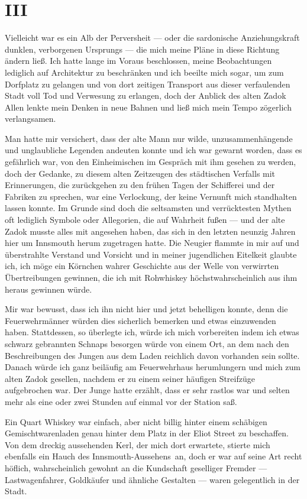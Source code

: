 \chapter*{III}

Vielleicht war es ein Alb der Perversheit --- oder die sardonische Anziehungskraft dunklen, verborgenen Ursprungs --- die mich meine Pläne in diese Richtung ändern ließ. Ich hatte lange im Voraus beschlossen, meine Beobachtungen lediglich auf Architektur zu beschränken und ich beeilte mich sogar, um zum Dorfplatz zu gelangen und von dort zeitigen Transport aus dieser verfaulenden Stadt voll Tod und Verwesung zu erlangen, doch der Anblick des alten Zadok Allen lenkte mein Denken in neue Bahnen und ließ mich mein Tempo zögerlich verlangsamen.

Man hatte mir versichert, dass der alte Mann nur wilde, unzusammenhängende und unglaubliche Legenden andeuten konnte und ich war gewarnt worden, dass es gefährlich war, von den Einheimischen im Gespräch mit ihm gesehen zu werden, doch der Gedanke, zu diesem alten Zeitzeugen des städtischen Verfalls mit Erinnerungen, die zurückgehen zu den frühen Tagen der Schifferei und der Fabriken zu sprechen, war eine Verlockung, der keine Vernunft mich standhalten lassen konnte. Im Grunde sind doch die seltsamsten und verrücktesten Mythen oft lediglich Symbole oder Allegorien, die auf Wahrheit fußen --- und der alte Zadok musste alles mit angesehen haben, das sich in den letzten neunzig Jahren hier um Innsmouth herum zugetragen hatte. Die Neugier flammte in mir auf und überstrahlte Verstand und Vorsicht und in meiner jugendlichen Eitelkeit glaubte ich, ich möge ein Körnchen wahrer Geschichte aus der Welle von verwirrten Übertreibungen gewinnen, die ich mit Rohwhiskey höchstwahrscheinlich aus ihm heraus gewinnen würde.

Mir war bewusst, dass ich ihn nicht hier und jetzt behelligen konnte, denn die Feuerwehrmänner würden dies sicherlich bemerken und etwas einzuwenden haben. Stattdessen, so überlegte ich, würde ich mich vorbereiten indem ich etwas schwarz gebrannten Schnaps besorgen würde von einem Ort, an dem nach den Beschreibungen des Jungen aus dem Laden reichlich davon vorhanden sein sollte. Danach würde ich ganz beiläufig am Feuerwehrhaus herumlungern und mich zum alten Zadok gesellen, nachdem er zu einem seiner häufigen Streifzüge aufgebrochen war. Der Junge hatte erzählt, dass er sehr rastlos war und selten mehr als eine oder zwei Stunden auf einmal vor der Station saß.

Ein Quart Whiskey war einfach, aber nicht billig hinter einem schäbigen Gemischtwarenladen genau hinter dem Platz in der Eliot Street zu beschaffen. Von dem dreckig aussehenden Kerl, der mich dort erwartete, stierte mich ebenfalls ein Hauch des \glqq Innsmouth-Aussehens\grqq\ an, doch er war auf seine Art recht höflich, wahrscheinlich gewohnt an die Kundschaft geselliger Fremder --- Lastwagenfahrer, Goldkäufer und ähnliche Gestalten --- waren gelegentlich in der Stadt.

